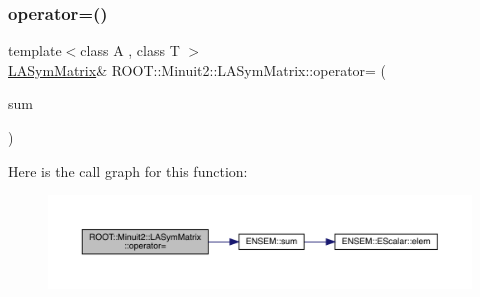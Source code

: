 \subsubsection{\texorpdfstring{operator=()}{operator=()}\hspace{0.1cm}{\footnotesize\ttfamily [10/14]}}
{\footnotesize\ttfamily template$<$class A , class T $>$ \\
\mbox{\hyperlink{classROOT_1_1Minuit2_1_1LASymMatrix}{L\+A\+Sym\+Matrix}}\& R\+O\+O\+T\+::\+Minuit2\+::\+L\+A\+Sym\+Matrix\+::operator= (\begin{DoxyParamCaption}\item[{const \mbox{\hyperlink{classROOT_1_1Minuit2_1_1ABObj}{A\+B\+Obj}}$<$ \mbox{\hyperlink{classROOT_1_1Minuit2_1_1sym}{sym}}, \mbox{\hyperlink{classROOT_1_1Minuit2_1_1ABSum}{A\+B\+Sum}}$<$ \mbox{\hyperlink{classROOT_1_1Minuit2_1_1ABObj}{A\+B\+Obj}}$<$ \mbox{\hyperlink{classROOT_1_1Minuit2_1_1sym}{sym}}, \mbox{\hyperlink{classROOT_1_1Minuit2_1_1LASymMatrix}{L\+A\+Sym\+Matrix}}, T $>$, \mbox{\hyperlink{classROOT_1_1Minuit2_1_1ABObj}{A\+B\+Obj}}$<$ \mbox{\hyperlink{classROOT_1_1Minuit2_1_1sym}{sym}}, A, T $>$ $>$, T $>$ \&}]{sum }\end{DoxyParamCaption})\hspace{0.3cm}{\ttfamily [inline]}}

Here is the call graph for this function\+:
\nopagebreak
\begin{figure}[H]
\begin{center}
\leavevmode
\includegraphics[width=350pt]{d3/d72/classROOT_1_1Minuit2_1_1LASymMatrix_abaf8a2feeb04c66aca17e5876dd7aaff_cgraph}
\end{center}
\end{figure}
\mbox{\label{classROOT_1_1Minuit2_1_1LASymMatrix_a95fd77b55f726095a231817852fceb7d}} 
